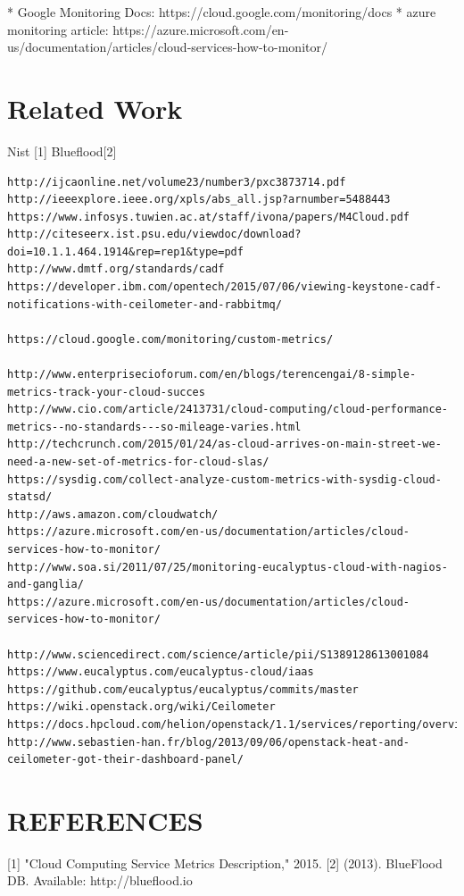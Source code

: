 \documentclass{sig-alternate}
\begin{document}
*  Google Monitoring Docs: https://cloud.google.com/monitoring/docs
*  azure monitoring article: https://azure.microsoft.com/en-us/documentation/articles/cloud-services-how-to-monitor/

\section{Related Work}

Nist [1]
Blueflood[2]
\begin{verbatim}
http://ijcaonline.net/volume23/number3/pxc3873714.pdf
http://ieeexplore.ieee.org/xpls/abs_all.jsp?arnumber=5488443
https://www.infosys.tuwien.ac.at/staff/ivona/papers/M4Cloud.pdf
http://citeseerx.ist.psu.edu/viewdoc/download?doi=10.1.1.464.1914&rep=rep1&type=pdf
http://www.dmtf.org/standards/cadf
https://developer.ibm.com/opentech/2015/07/06/viewing-keystone-cadf-notifications-with-ceilometer-and-rabbitmq/

https://cloud.google.com/monitoring/custom-metrics/

http://www.enterprisecioforum.com/en/blogs/terencengai/8-simple-metrics-track-your-cloud-succes
http://www.cio.com/article/2413731/cloud-computing/cloud-performance-metrics--no-standards---so-mileage-varies.html
http://techcrunch.com/2015/01/24/as-cloud-arrives-on-main-street-we-need-a-new-set-of-metrics-for-cloud-slas/
https://sysdig.com/collect-analyze-custom-metrics-with-sysdig-cloud-statsd/
http://aws.amazon.com/cloudwatch/
https://azure.microsoft.com/en-us/documentation/articles/cloud-services-how-to-monitor/
http://www.soa.si/2011/07/25/monitoring-eucalyptus-cloud-with-nagios-and-ganglia/
https://azure.microsoft.com/en-us/documentation/articles/cloud-services-how-to-monitor/

http://www.sciencedirect.com/science/article/pii/S1389128613001084
https://www.eucalyptus.com/eucalyptus-cloud/iaas
https://github.com/eucalyptus/eucalyptus/commits/master
https://wiki.openstack.org/wiki/Ceilometer
https://docs.hpcloud.com/helion/openstack/1.1/services/reporting/overview/
http://www.sebastien-han.fr/blog/2013/09/06/openstack-heat-and-ceilometer-got-their-dashboard-panel/
\end{verbatim}





\section{REFERENCES}

[1]     "Cloud Computing Service Metrics Description," 2015.
[2]     (2013). BlueFlood DB. Available: http://blueflood.io
\end{document}
